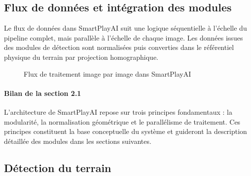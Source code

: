 \subsection{Flux de données et intégration des modules}

Le flux de données dans SmartPlayAI suit une logique séquentielle à l’échelle du pipeline complet, mais parallèle à l’échelle de chaque image. Les données issues des modules de détection sont normalisées puis converties dans le référentiel physique du terrain par projection homographique.

\begin{figure}[H]
    \centering
    \caption{Flux de traitement image par image dans SmartPlayAI}
    \label{fig:dataflow-smartplayai}
\end{figure}

\paragraph{Bilan de la section 2.1}
L’architecture de SmartPlayAI repose sur trois principes fondamentaux : la modularité, la normalisation géométrique et le parallélisme de traitement. Ces principes constituent la base conceptuelle du système et guideront la description détaillée des modules dans les sections suivantes.
\subsection{Détection du terrain}

